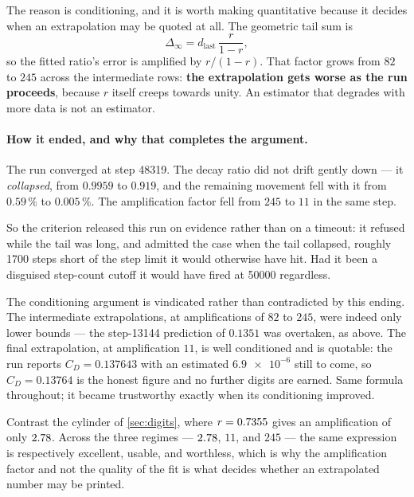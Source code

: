 The reason is conditioning, and it is worth making quantitative because it decides when an
extrapolation may be quoted at all. The geometric tail sum is
\begin{equation}
  \Delta_\infty = d_{\text{last}}\,\frac{r}{1-r},
  \label{eq:tailsum}
\end{equation}
so the fitted ratio's error is amplified by $r/(1-r)$. That factor grows from $82$ to $245$
across the intermediate rows: \textbf{the extrapolation gets worse as the run proceeds},
because $r$ itself creeps towards unity. An estimator that degrades with more data is not
an estimator.

\paragraph{How it ended, and why that completes the argument.} The run converged at step
\num{48319}. The decay ratio did not drift gently down --- it \emph{collapsed}, from
$0.9959$ to $0.919$, and the remaining movement fell with it from $0.59\,\%$ to
$0.005\,\%$. The amplification factor fell from $245$ to $11$ in the same step.

So the criterion released this run on evidence rather than on a timeout: it refused while
the tail was long, and admitted the case when the tail collapsed, roughly \num{1700} steps
short of the step limit it would otherwise have hit. Had it been a disguised step-count
cutoff it would have fired at \num{50000} regardless.

The conditioning argument is vindicated rather than contradicted by this ending. The
intermediate extrapolations, at amplifications of $82$ to $245$, were indeed only lower
bounds --- the step-\num{13144} prediction of $0.1351$ was overtaken, as above. The final
extrapolation, at amplification $11$, is well conditioned and is quotable: the run reports
$C_D=0.137643$ with an estimated $\num{6.9e-6}$ still to come, so
\textbf{$C_D=0.13764$} is the honest figure and no further digits are earned. Same
formula throughout; it became trustworthy exactly when its conditioning improved.

Contrast the cylinder of \cref{sec:digits}, where $r=\num{0.7355}$ gives an
amplification of only
$\num{2.78}$. Across the three regimes --- $\num{2.78}$, $11$, and $245$
--- the same expression is
respectively excellent, usable, and worthless, which is why the amplification factor and
not the quality of the fit is what decides whether an extrapolated number may be printed.


